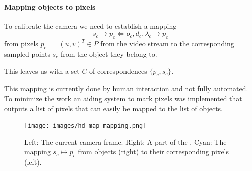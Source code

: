 \paragraph{Mapping objects to pixels}

To calibrate the camera we need to establish a mapping
\begin{equation}
  s_c \mapsto p_c \Leftrightarrow  {o_c, d_c, \lambda_c} \mapsto p_c
\end{equation}
from pixels $p_c~=~(u,v)^T \in P$ from the video stream to the corresponding sampled points $s_c$ from the object they belong to.

This leaves us with a set $C$ of correspondences $\{p_c,s_c\}$.

This mapping is currently done by human interaction and not fully automated. 
To minimize the work an aiding system to mark pixels was implemented that outputs a list of pixels that can easily be mapped to the list of objects.

\begin{figure}[t]
  \begin{center}
     \texttt{[image: images/hd\_map\_mapping.png]}
  \end{center}
     \caption{Left: The current camera frame. Right: A part of the \HDmaps{}. Cyan: The mapping $s_c \mapsto p_c$ from objects (right) to their corresponding pixels (left).}
  \label{fig:hd_map_mapping}
  \end{figure}


